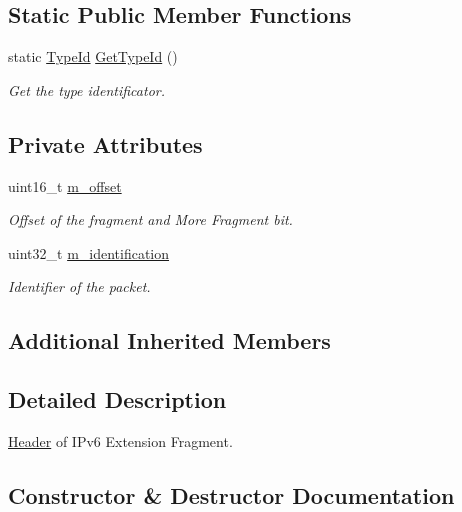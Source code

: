 \subsection*{Static Public Member Functions}
\begin{DoxyCompactItemize}
\item 
static \hyperlink{classns3_1_1TypeId}{Type\+Id} \hyperlink{classns3_1_1Ipv6ExtensionFragmentHeader_a229c964492b101b58a6885d5e4d61e4c}{Get\+Type\+Id} ()
\begin{DoxyCompactList}\small\item\em Get the type identificator. \end{DoxyCompactList}\end{DoxyCompactItemize}
\subsection*{Private Attributes}
\begin{DoxyCompactItemize}
\item 
uint16\+\_\+t \hyperlink{classns3_1_1Ipv6ExtensionFragmentHeader_a95f8f36dd6cf53ec12db5322cfb85a11}{m\+\_\+offset}
\begin{DoxyCompactList}\small\item\em Offset of the fragment and More Fragment bit. \end{DoxyCompactList}\item 
uint32\+\_\+t \hyperlink{classns3_1_1Ipv6ExtensionFragmentHeader_a493d1bb240172953356d460041a895b6}{m\+\_\+identification}
\begin{DoxyCompactList}\small\item\em Identifier of the packet. \end{DoxyCompactList}\end{DoxyCompactItemize}
\subsection*{Additional Inherited Members}


\subsection{Detailed Description}
\hyperlink{classns3_1_1Header}{Header} of I\+Pv6 Extension Fragment. 

\subsection{Constructor \& Destructor Documentation}

